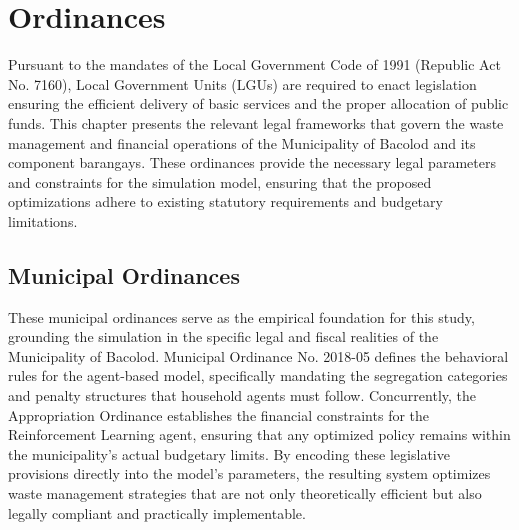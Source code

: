 \chapter{Ordinances}
\label{chap:ordinances}

Pursuant to the mandates of the Local Government Code of 1991 (Republic Act No. 7160), Local Government Units (LGUs) are required to enact legislation ensuring the efficient delivery of basic services and the proper allocation of public funds. This chapter presents the relevant legal frameworks that govern the waste management and financial operations of the Municipality of Bacolod and its component barangays. These ordinances provide the necessary legal parameters and constraints for the simulation model, ensuring that the proposed optimizations adhere to existing statutory requirements and budgetary limitations.

\section{Municipal Ordinances}
\label{sec:municipal_ordinances}

These municipal ordinances serve as the empirical foundation for this study, grounding the simulation in the specific legal and fiscal realities of the Municipality of Bacolod. Municipal Ordinance No. 2018-05 defines the behavioral rules for the agent-based model, specifically mandating the segregation categories and penalty structures that household agents must follow. Concurrently, the Appropriation Ordinance establishes the financial constraints for the Reinforcement Learning agent, ensuring that any optimized policy remains within the municipality's actual budgetary limits. By encoding these legislative provisions directly into the model's parameters, the resulting system optimizes waste management strategies that are not only theoretically efficient but also legally compliant and practically implementable.







